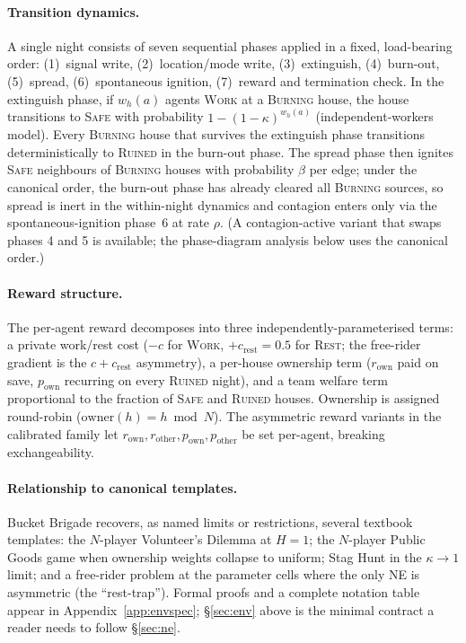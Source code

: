 \documentclass{anvil-paper}
\begin{document}
\paragraph{Transition dynamics.}
A single night consists of seven sequential phases applied in a fixed,
load-bearing order: (1)~signal write, (2)~location/mode write,
(3)~extinguish, (4)~burn-out, (5)~spread, (6)~spontaneous ignition,
(7)~reward and termination check. In the extinguish phase, if $w_h(a)$
agents \textsc{Work} at a \textsc{Burning} house, the house transitions to
\textsc{Safe} with probability $1-(1-\kappa)^{w_h(a)}$ (independent-workers
model). Every \textsc{Burning} house that survives the extinguish phase
transitions deterministically to \textsc{Ruined} in the burn-out phase. The
spread phase then ignites \textsc{Safe} neighbours of \textsc{Burning}
houses with probability $\beta$ per edge; under the canonical order, the
burn-out phase has already cleared all \textsc{Burning} sources, so spread is
inert in the within-night dynamics and contagion enters only via the
spontaneous-ignition phase~6 at rate $\rho$. (A contagion-active variant
that swaps phases 4 and 5 is available; the phase-diagram analysis below
uses the canonical order.)

\paragraph{Reward structure.}
The per-agent reward decomposes into three independently-parameterised terms:
a private work/rest cost ($-c$ for \textsc{Work}, $+c_{\text{rest}}{=}0.5$
for \textsc{Rest}; the free-rider gradient is the $c{+}c_{\text{rest}}$
asymmetry), a per-house ownership term ($r_{\text{own}}$ paid on save,
$p_{\text{own}}$ recurring on every \textsc{Ruined} night), and a team
welfare term proportional to the fraction of \textsc{Safe} and
\textsc{Ruined} houses. Ownership is assigned round-robin
($\text{owner}(h){=}h\bmod N$). The asymmetric reward variants in the
calibrated family let $r_{\text{own}},r_{\text{other}},p_{\text{own}},
p_{\text{other}}$ be set per-agent, breaking exchangeability.

\paragraph{Relationship to canonical templates.}
Bucket Brigade recovers, as named limits or restrictions, several textbook
templates: the $N$-player Volunteer's Dilemma at $H{=}1$; the $N$-player
Public Goods game when ownership weights collapse to uniform; Stag Hunt in
the $\kappa{\to}1$ limit; and a free-rider problem at the parameter cells
where the only NE is asymmetric (the ``rest-trap''). Formal proofs and a
complete notation table appear in Appendix~\ref{app:envspec};
\S\ref{sec:env} above is the minimal contract a reader needs to follow
\S\ref{sec:ne}.
\end{document}
